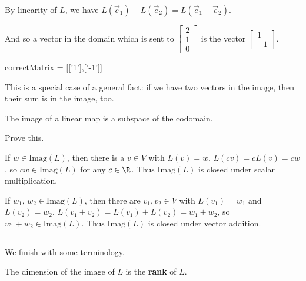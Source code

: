 \documentclass{ximera}
\begin{document}
\begin{question}
\begin{solution}
    \begin{hint}
      By linearity of $L$, we have $L(\vec{e}_1) - L(\vec{e}_2) = L(\vec{e}_1 - \vec{e}_2)$.
    \end{hint}

    \begin{hint}
      And so a vector in the domain which is sent to $\begin{bmatrix} 2 \\ 1 \\ 0 \end{bmatrix}$ is the vector $\begin{bmatrix} 1 \\ -1 \end{bmatrix}$.
    \end{hint}

    \begin{matrix-answer}[name=v]
      correctMatrix = [['1'],['-1']]
    \end{matrix-answer}
  \end{solution}

  This is a special case of a general fact: if we have two vectors in the image, then their sum is in the image, too.

  \begin{theorem}
    The image of a linear map is a subspace of the codomain.
  \end{theorem}

  Prove this.

  \begin{free-response}
    If $w \in \text{Imag}(L)$, then there is a $v \in V$ with $L(v) =w$.  $L(cv) = cL(v)=cw$, so $cw \in \text{Imag}(L)$ for any $c\in \R$. 
    Thus $\text{Imag}(L)$ is closed under scalar multiplication.
    
    If $w_1$, $w_2 \in \text{Imag}(L)$, then there are $v_1,v_2 \in V$ with $L(v_1)=w_1$ and $L(v_2)=w_2$.  $L(v_1+v_2)=L(v_1)+L(v_2)=w_1+w_2$, so $w_1+w_2 \in \text{Imag}(L)$.
    Thus $\text{Imag}(L)$ is closed under vector addition.
  \end{free-response}

\end{question}

\hrule

We finish with some terminology.

\begin{definition}
  The dimension of the image of $L$ is the \textbf{rank} of $L$.
\end{definition}
\end{document}
